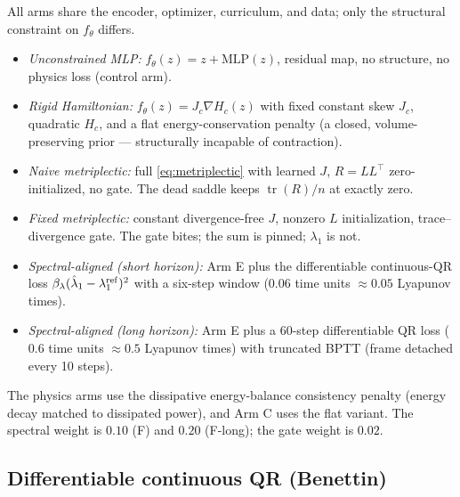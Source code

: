\documentclass[journal]{IEEEtran}
\newcommand{\tr}{\operatorname{tr}}
\newcommand{\grad}{\nabla}
\begin{document}
All arms share the encoder, optimizer, curriculum, and data; only the
structural constraint on $f_\theta$ differs.
\begin{itemize}
\item[\textbf{B}] \emph{Unconstrained MLP:} $f_\theta(z)=z+\mathrm{MLP}(z)$,
residual map, no structure, no physics loss (control arm).
\item[\textbf{C}] \emph{Rigid Hamiltonian:} $f_\theta(z)=J_c\grad H_c(z)$
with fixed constant skew $J_c$, quadratic $H_c$, and a flat
energy-conservation penalty (a closed, volume-preserving prior ---
structurally incapable of contraction).
\item[\textbf{D}] \emph{Naive metriplectic:} full
\eqref{eq:metriplectic} with learned $J$, $R=LL^\top$ zero-initialized,
no gate. The dead saddle keeps $\tr(R)/n$ at exactly zero.
\item[\textbf{E}] \emph{Fixed metriplectic:} constant divergence-free
$J$, nonzero $L$ initialization, trace--divergence gate. The gate bites;
the sum is pinned; $\lambda_1$ is not.
\item[\textbf{F}] \emph{Spectral-aligned (short horizon):} Arm E plus
the differentiable continuous-QR loss
$\beta_\lambda(\hat\lambda_1-\lambda_1^{\rm ref})^2$ with a six-step
window ($0.06$ time units $\approx0.05$ Lyapunov times).
\item[\textbf{F-long}] \emph{Spectral-aligned (long horizon):} Arm E
plus a 60-step differentiable QR loss ($0.6$ time units $\approx0.5$
Lyapunov times) with truncated BPTT (frame detached every 10 steps).
\end{itemize}
The physics arms use the dissipative energy-balance consistency penalty
(energy decay matched to dissipated power), and Arm C uses the flat
variant. The spectral weight is $0.10$ (F) and $0.20$ (F-long); the gate
weight is $0.02$.

\subsection{Differentiable continuous QR (Benettin)}
\label{sec:methods-qr}
\end{document}
